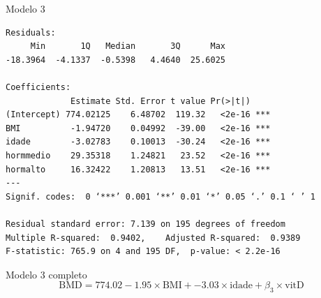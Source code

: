\documentclass{beamer}
\begin{document}
\begin{frame}[fragile]{\scriptsize }
  \begin{center}
    \begin{exampleblock}{Modelo 3}
      \tiny
\begin{verbatim}
Residuals:
     Min       1Q   Median       3Q      Max 
-18.3964  -4.1337  -0.5398   4.4640  25.6025 

Coefficients:
             Estimate Std. Error t value Pr(>|t|)    
(Intercept) 774.02125    6.48702  119.32   <2e-16 ***
BMI          -1.94720    0.04992  -39.00   <2e-16 ***
idade        -3.02783    0.10013  -30.24   <2e-16 ***
hormmedio    29.35318    1.24821   23.52   <2e-16 ***
hormalto     16.32422    1.20813   13.51   <2e-16 ***
---
Signif. codes:  0 ‘***’ 0.001 ‘**’ 0.01 ‘*’ 0.05 ‘.’ 0.1 ‘ ’ 1

Residual standard error: 7.139 on 195 degrees of freedom
Multiple R-squared:  0.9402,	Adjusted R-squared:  0.9389 
F-statistic: 765.9 on 4 and 195 DF,  p-value: < 2.2e-16
\end{verbatim}
    \end{exampleblock}
  \begin{exampleblock}{Modelo 3 completo}
    \footnotesize
    \begin{displaymath}
      \text{BMD} =774.02 -1.95 \times\text{BMI} + -3.03 \times\text{idade} + \beta_3 \times\text{vitD}
    \end{displaymath}
  \end{exampleblock}
  \end{center}
\end{frame}
\end{document}
